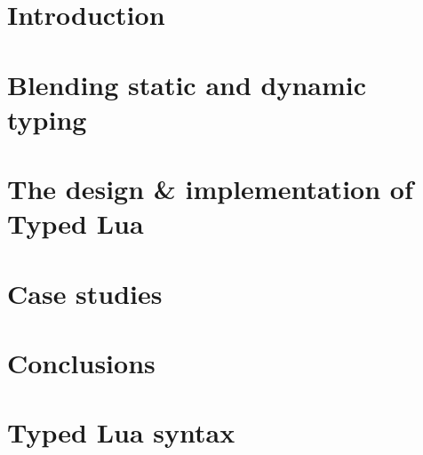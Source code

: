 \documentclass[pdftex,12pt,a4paper]{report}
\begin{document}
\chapter{Introduction}
\label{chap:intro}


\chapter{Blending static and dynamic typing}
\label{chap:review}


\chapter{The design \& implementation of Typed Lua}
\label{chap:typedlua}


\chapter{Case studies}
\label{chap:cases}


\chapter{Conclusions}
\label{chap:conc}


\appendix
\chapter{Typed Lua syntax}
\label{app:syntax}




\end{document}
